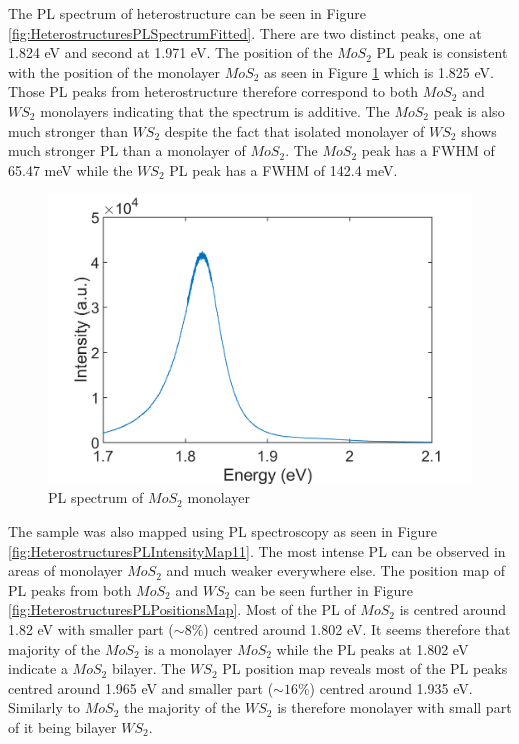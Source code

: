 The PL spectrum of heterostructure can be seen in Figure \ref{fig:HeterostructuresPLSpectrumFitted}. There are two distinct peaks, one  at 1.824 eV and second at 1.971 eV. The position of the $MoS_2$ PL peak is consistent with the position of the monolayer $MoS_2$ as seen in Figure \ref{fig:HeterostructuresPLSpectrumMono} which is 1.825 eV. Those PL peaks from heterostructure therefore correspond to both $MoS_2$ and $WS_2$ monolayers indicating that the spectrum is additive. The $MoS_2$ peak is also much stronger than $WS_2$ despite the fact that isolated monolayer of $WS_2$ shows much stronger PL than a monolayer of $MoS_2$. The $MoS_2$ peak has a FWHM of 65.47 meV while the $WS_2$ PL peak has a FWHM of 142.4 meV. 

\begin{figure}[H]
	\begin{center}
		\includegraphics[scale=0.3]{Heterostructures/HeterostructurePLSpectrumMono.png}
		\caption{PL spectrum of $MoS_2$ monolayer}
		\label{fig:HeterostructuresPLSpectrumMono}
	\end{center}
\end{figure}

The sample was also mapped using PL spectroscopy as seen in Figure \ref{fig:HeterostructuresPLIntensityMap11}. The most intense PL can be observed in areas of monolayer $MoS_2$ and much weaker everywhere else. The position map of PL peaks from both $MoS_2$ and $WS_2$ can be seen further in Figure \ref{fig:HeterostructuresPLPositionsMap}. Most of the PL of $MoS_2$ is centred around 1.82 eV with smaller part ($\sim 8 \%$) centred around 1.802 eV. It seems therefore that majority of the $MoS_2$ is a monolayer $MoS_2$ while the PL peaks at 1.802 eV indicate a $MoS_2$ bilayer. The $WS_2$ PL position map reveals most of the PL peaks centred around 1.965 eV and smaller part ($\sim 16 \%$) centred around 1.935 eV. Similarly to $MoS_2$ the majority of the $WS_2$ is therefore monolayer with small part of it being bilayer $WS_2$.


